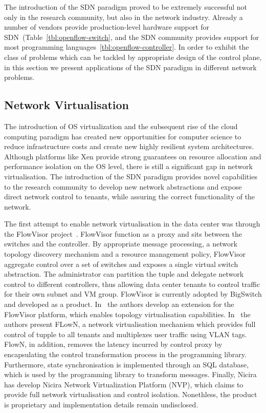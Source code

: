 The introduction of the SDN paradigm proved to be extremely successful not only
in the research community, but also in the network industry. Already a number of
vendors provide production-level hardware support for
SDN~(Table~\ref{tbl:openflow-switch}, and the SDN community provides \of support
for most programming languages~\ref{tbl:openflow-controller}.  In order to
exhibit the class of problems which can be tackled by appropriate design of the
control plane, in this section we present applications of the SDN paradigm in
different network problems. 

\subsection{Network Virtualisation}

The introduction of OS virtualization and the subsequent rise of the cloud
computing paradigm has created new opportunities for computer science to reduce
infrastructure costs and create new highly resilient system architectures.
Although platforms like Xen provide strong guarantees on resource allocation and
performance isolation on the OS level, there is still a significant gap in
network virtualisation.  The introduction of the SDN paradigm provides novel
capabilities to the research community to develop new network abstractions and
expose direct network control to tenants, while assuring the correct
functionality of the network. 

The first attempt to enable network virtualisation
in the data center was through the FlowVisor project~\cite{flowvisor-ccr}.
FlowVisor function as a \of proxy and sits between the \of switches and the \of
controller. By appropriate message processing, a network topology discovery
mechanism and a resource management policy, FlowVisor aggregate control over a
set of switches and exposes a single virtual switch 
abstraction. The administrator can partition the \of tuple and delegate
network control to different controllers, thus allowing data center tenants to
control traffic for their own subnet and VM group. FlowVisor is currently
adopted by BigSwitch and developed as a product. In~\cite{Corin12} the authors
develop an extension for the FlowVisor  platform, which enables
topology virtualisation capabilities. In~\cite{Drutskoy13} the authors present FLowN,
a network virtualisation mechanism which provides full control of \of tupple to
all tenants and multiplexes user traffic using VLAN tags. FlowN, in addition,
removes the latency incurred by control proxy by encapsulating the control
transformation process in the programming library. Furthermore,
state synchronisation is implemented through an SQL database, which
is used by the programming library to transform \of messages. Finally, Nicira has
develop Nicira Network Virtualization Platform (NVP), which claims to provide
full network virtualisation and control isolation. Nonethless, the product is
proprietary and implementation details remain undisclosed.  

